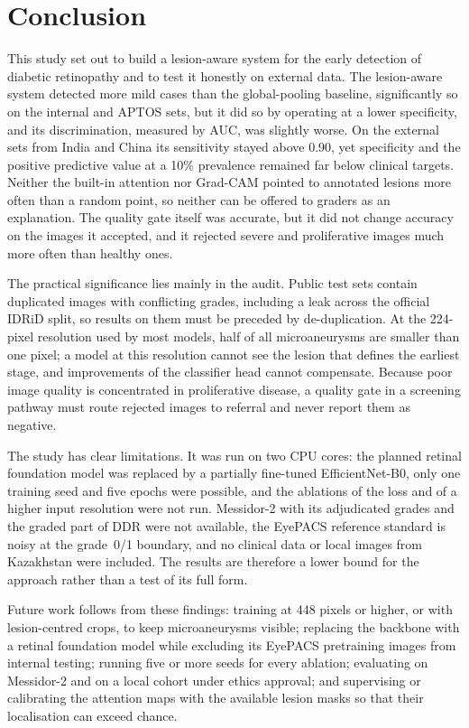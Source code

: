 \section{Conclusion}\label{sec:conc}
This study set out to build a lesion-aware system for the early detection of diabetic retinopathy and to test it honestly on external data. The lesion-aware system detected more mild cases than the global-pooling baseline, significantly so on the internal and APTOS sets, but it did so by operating at a lower specificity, and its discrimination, measured by AUC, was slightly worse. On the external sets from India and China its sensitivity stayed above 0.90, yet specificity and the positive predictive value at a 10\% prevalence remained far below clinical targets. Neither the built-in attention nor Grad-CAM pointed to annotated lesions more often than a random point, so neither can be offered to graders as an explanation. The quality gate itself was accurate, but it did not change accuracy on the images it accepted, and it rejected severe and proliferative images much more often than healthy ones.

The practical significance lies mainly in the audit. Public test sets contain duplicated images with conflicting grades, including a leak across the official IDRiD split, so results on them must be preceded by de-duplication. At the 224-pixel resolution used by most models, half of all microaneurysms are smaller than one pixel; a model at this resolution cannot see the lesion that defines the earliest stage, and improvements of the classifier head cannot compensate. Because poor image quality is concentrated in proliferative disease, a quality gate in a screening pathway must route rejected images to referral and never report them as negative.

The study has clear limitations. It was run on two CPU cores: the planned retinal foundation model was replaced by a partially fine-tuned EfficientNet-B0, only one training seed and five epochs were possible, and the ablations of the loss and of a higher input resolution were not run. Messidor-2 with its adjudicated grades and the graded part of DDR were not available, the EyePACS reference standard is noisy at the grade~0/1 boundary, and no clinical data or local images from Kazakhstan were included. The results are therefore a lower bound for the approach rather than a test of its full form.

Future work follows from these findings: training at 448 pixels or higher, or with lesion-centred crops, to keep microaneurysms visible; replacing the backbone with a retinal foundation model while excluding its EyePACS pretraining images from internal testing; running five or more seeds for every ablation; evaluating on Messidor-2 and on a local cohort under ethics approval; and supervising or calibrating the attention maps with the available lesion masks so that their localisation can exceed chance.
